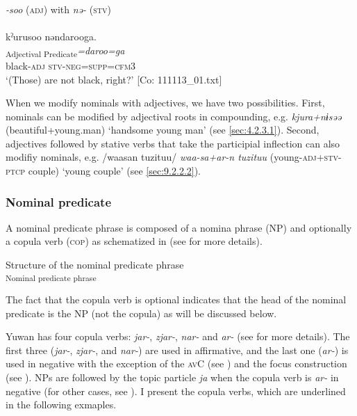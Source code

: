  \ex\textit{{}-soo} (\textsc{adj}) with \textit{nə-} (\textsc{stv}) \label{ex:4.11b}\\\\
\glll   kˀurusoo  nəndarooga.\\
    [\textit{kˀuru-\Highlight{soo}}  \textit{\Highlight{nə}-an}]\textsubscript{Adjectival Predicate}\textit{=daroo=ga}\\
    black-\textsc{adj}  \textsc{stv}-\textsc{neg}=\textsc{supp}=\textsc{cfm}3\\
    \glt     ‘(Those) are not black, right?’ [Co: 111113\_01.txt]
    \z
\z

When we modify nominals with adjectives, we have two possibilities. First, nominals can be modified by adjectival roots in compounding, e.g. \textit{kjura+nɨsəə} (beautiful+young.man) ‘handsome young man’ (see \ref{sec:4.2.3.1}). Second, adjectives followed by stative verbs that take the participial inflection can also modifiy nominals, e.g. /waasan tuzituu/ \textit{waa-sa+ar-n tuzituu} (young-\textsc{adj}+\textsc{stv}-\textsc{ptcp} couple) ‘young couple’ (see \ref{sec:9.2.2.2}).

\subsubsection{Nominal predicate}\label{sec:4.1.3.3}

A nominal predicate phrase is composed of a nomina phrase (NP) and optionally a copula verb (\textsc{cop}) as schematized in  (see  for more details).

\ea  Structure of the nominal predicate phrase \label{ex:4.12}\\\textsubscript{Nominal predicate phrase}
\z

The fact that the copula verb is optional indicates that the head of the nominal predicate is the NP (not the copula) as will be discussed below.

Yuwan has four copula verbs: \textit{jar-}, \textit{zjar-}, \textit{nar-} and \textit{ar-} (see  for more details). The first three (\textit{jar-}, \textit{zjar-}, and \textit{nar-}) are used in affirmative, and the last one (\textit{ar-}) is used in negative with the exception of the \textsc{av}C (see ) and the focus construction (see ). NPs are followed by the topic particle \textit{ja} when the copula verb is \textit{ar-} in negative (for other cases, see ). I present the copula verbs, which are underlined in the following exmaples.

